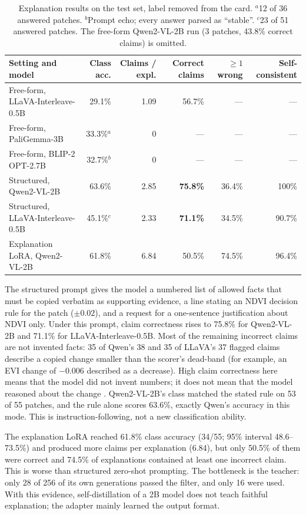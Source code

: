 \documentclass[11pt]{article}
\begin{document}
\begin{table}[t]
\centering
\small
\begin{tabular}{lrrrrr}
\toprule
Setting and model & Class acc. & Claims / expl. & Correct claims & $\ge 1$ wrong & Self-consistent \\
\midrule
Free-form, LLaVA-Interleave-0.5B & 29.1\% & 1.09 & 56.7\% & --- & --- \\
Free-form, PaliGemma-3B & 33.3\%$^{a}$ & 0 & --- & --- & --- \\
Free-form, BLIP-2 OPT-2.7B & 32.7\%$^{b}$ & 0 & --- & --- & --- \\
\midrule
Structured, Qwen2-VL-2B & 63.6\% & 2.85 & \textbf{75.8\%} & 36.4\% & 100\% \\
Structured, LLaVA-Interleave-0.5B & 45.1\%$^{c}$ & 2.33 & \textbf{71.1\%} & 34.5\% & 90.7\% \\
\midrule
Explanation LoRA, Qwen2-VL-2B & 61.8\% & 6.84 & 50.5\% & 74.5\% & 96.4\% \\
\bottomrule
\end{tabular}
\caption{Explanation results on the test set, label removed from the
card. $^{a}$12 of 36 answered patches. $^{b}$Prompt echo; every answer
parsed as ``stable''. $^{c}$23 of 51 answered patches. The free-form
Qwen2-VL-2B run (3 patches, 43.8\% correct claims) is omitted.}
\label{tab:explain}
\end{table}

The structured prompt gives the model a numbered list of allowed facts
that must be copied verbatim as supporting evidence, a line stating an
NDVI decision rule for the patch ($\pm 0.02$), and a request for a
one-sentence justification about NDVI only. Under this prompt, claim
correctness rises to 75.8\% for Qwen2-VL-2B and 71.1\% for
LLaVA-Interleave-0.5B. Most of the remaining incorrect claims are not
invented facts: 35 of Qwen's 38 and 35 of LLaVA's 37 flagged claims
describe a copied change smaller than the scorer's dead-band (for
example, an EVI change of $-0.006$ described as a decrease). High claim
correctness here means that the model did not invent numbers; it does
not mean that the model reasoned about the change
\citep{jacovi2020,turpin2023}. Qwen2-VL-2B's class matched the stated
rule on 53 of 55 patches, and the rule alone scores 63.6\%, exactly
Qwen's accuracy in this mode. This is instruction-following, not a new
classification ability.

The explanation LoRA reached 61.8\% class accuracy (34/55; 95\% interval
48.6--73.5\%) and produced more claims per explanation (6.84), but only
50.5\% of them were correct and 74.5\% of explanations contained at
least one incorrect claim. This is worse than structured zero-shot
prompting. The bottleneck is the teacher: only 28 of 256 of its own
generations passed the filter, and only 16 were used. With this
evidence, self-distillation of a 2B model does not teach faithful
explanation; the adapter mainly learned the output format.
\end{document}
